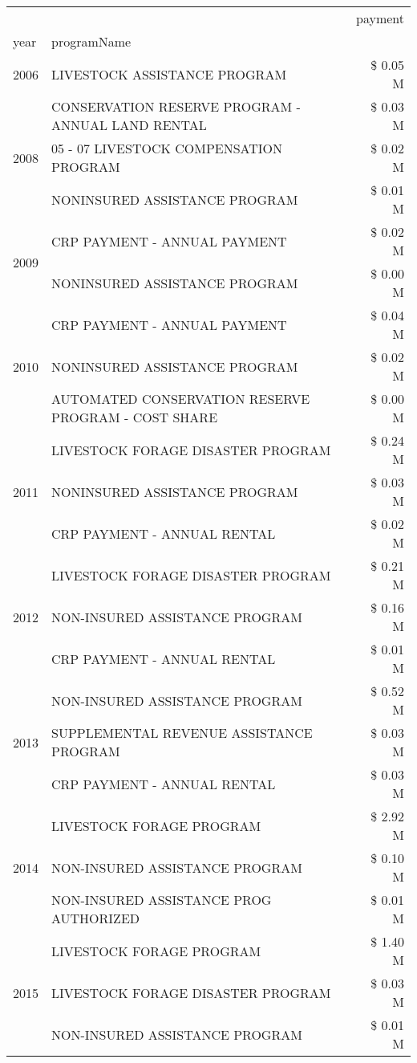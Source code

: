 \begin{tabular}{llr}
\toprule
 &  & payment \\
year & programName &  \\
\midrule
2006 & LIVESTOCK ASSISTANCE PROGRAM & \$ 0.05 M \\
\cline{1-3}
\multirow[t]{3}{*}{2008} & CONSERVATION RESERVE PROGRAM - ANNUAL LAND RENTAL & \$ 0.03 M \\
 & 05 - 07 LIVESTOCK COMPENSATION PROGRAM & \$ 0.02 M \\
 & NONINSURED ASSISTANCE PROGRAM & \$ 0.01 M \\
\cline{1-3}
\multirow[t]{2}{*}{2009} & CRP PAYMENT - ANNUAL PAYMENT & \$ 0.02 M \\
 & NONINSURED ASSISTANCE PROGRAM & \$ 0.00 M \\
\cline{1-3}
\multirow[t]{3}{*}{2010} & CRP PAYMENT - ANNUAL PAYMENT & \$ 0.04 M \\
 & NONINSURED ASSISTANCE PROGRAM & \$ 0.02 M \\
 & AUTOMATED CONSERVATION RESERVE PROGRAM - COST SHARE & \$ 0.00 M \\
\cline{1-3}
\multirow[t]{3}{*}{2011} & LIVESTOCK FORAGE DISASTER PROGRAM & \$ 0.24 M \\
 & NONINSURED ASSISTANCE PROGRAM & \$ 0.03 M \\
 & CRP PAYMENT - ANNUAL RENTAL & \$ 0.02 M \\
\cline{1-3}
\multirow[t]{3}{*}{2012} & LIVESTOCK FORAGE DISASTER PROGRAM & \$ 0.21 M \\
 & NON-INSURED ASSISTANCE PROGRAM & \$ 0.16 M \\
 & CRP PAYMENT - ANNUAL RENTAL & \$ 0.01 M \\
\cline{1-3}
\multirow[t]{3}{*}{2013} & NON-INSURED ASSISTANCE PROGRAM & \$ 0.52 M \\
 & SUPPLEMENTAL REVENUE ASSISTANCE PROGRAM & \$ 0.03 M \\
 & CRP PAYMENT - ANNUAL RENTAL & \$ 0.03 M \\
\cline{1-3}
\multirow[t]{3}{*}{2014} & LIVESTOCK FORAGE PROGRAM & \$ 2.92 M \\
 & NON-INSURED ASSISTANCE PROGRAM & \$ 0.10 M \\
 & NON-INSURED ASSISTANCE PROG AUTHORIZED & \$ 0.01 M \\
\cline{1-3}
\multirow[t]{3}{*}{2015} & LIVESTOCK FORAGE PROGRAM & \$ 1.40 M \\
 & LIVESTOCK FORAGE DISASTER PROGRAM & \$ 0.03 M \\
 & NON-INSURED ASSISTANCE PROGRAM & \$ 0.01 M \\

\end{tabular}
